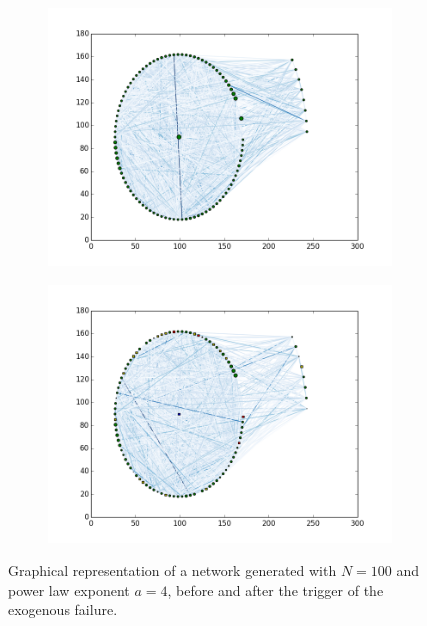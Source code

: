 \documentclass[a4paper, 11pt]{article}
\begin{document}
\begin{figure}[htbp]
    \centering
    \begin{subfigure}[b]{0.9\textwidth}
		\includegraphics[width=\textwidth]{images/network4.png}
	\end{subfigure}
    \begin{subfigure}[b]{0.9\textwidth}
		\includegraphics[width=\textwidth]{images/contagion4.png}
	\end{subfigure}
	\caption{Graphical representation of a network generated with $N = 100$ and power law exponent $a = 4$, before and after the trigger of the exogenous failure.}\label{fig:network4}
\end{figure}
 
\end{document}
